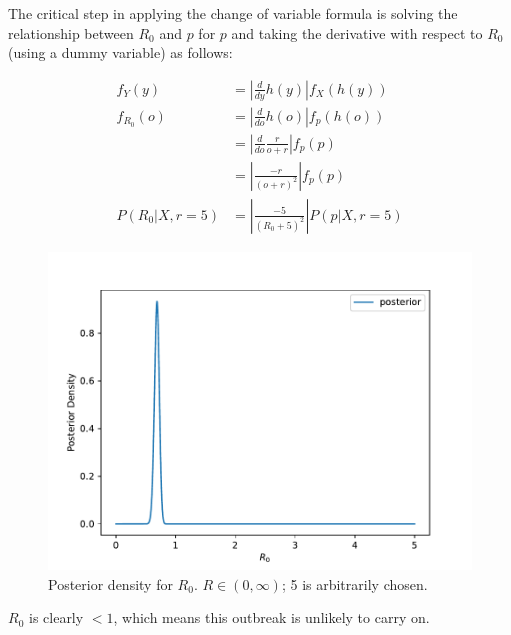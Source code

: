 The critical step in applying the change of variable formula is solving the relationship between $R_0$ and $p$ for $p$ and taking the derivative with respect to $R_0$ (using a dummy variable) as follows:

\begin{align*}
    f_Y(y) &= \left|\frac{d}{dy}h(y)\right|f_X(h(y))\\
    f_{R_0}(o) &= \left|\frac{d}{do}h(o)\right|f_p(h(o))\\
    &= \left|\frac{d}{do}\frac{r}{o+r}\right|f_p(p)\\
    &= \left|\frac{-r}{(o+r)^2}\right|f_p(p)\\
    P(R_0|X,r=5) &= \left|\frac{-5}{(R_0+5)^2}\right|P(p|X,r=5)
\end{align*}

\begin{figure}[H]
    \centering
    \includegraphics[width=0.8\linewidth]{images/r0_posterior_density.pdf}
    \caption{Posterior density for $R_0$. $R \in (0, \infty)$; 5 is arbitrarily chosen.}
    \label{fig:r0density}
\end{figure}


$R_0$ is clearly $<1$, which means this outbreak is unlikely to carry on.